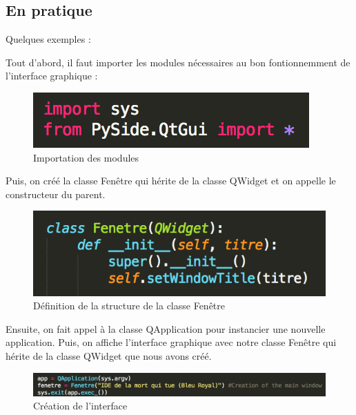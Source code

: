 \documentclass[a4paper,12pt]{article}
\begin{document}
	\subsection{En pratique} 

		Quelques exemples :

		Tout d'abord, il faut importer les modules nécessaires au bon fontionnemment de l'interface graphique :

		\begin{figure}[!h]

			\begin{center}

				\includegraphics[scale=1]{"images/Import"}

				\caption{Importation des modules}

			\end{center}

		\end{figure}

		Puis, on créé la classe Fenêtre qui hérite de la classe QWidget et on appelle le constructeur du parent.

		\begin{figure}[!h]

			\begin{center}

				\includegraphics[scale=0.8]{"images/QWidget"}

				\caption{Définition de la structure de la classe Fenêtre}
			\end{center}

		\end{figure}
		\newpage
		Ensuite, on fait appel à la classe QApplication pour instancier une nouvelle application. Puis, on affiche l'interface graphique avec notre classe Fenêtre qui hérite de la classe QWidget que nous avons créé. 

		\begin{figure}[!h]

			\begin{center}

				\includegraphics[scale=0.8]{"images/QApplication"}

				\caption{Création de l'interface}

			\end{center}

		\end{figure}
\end{document}
